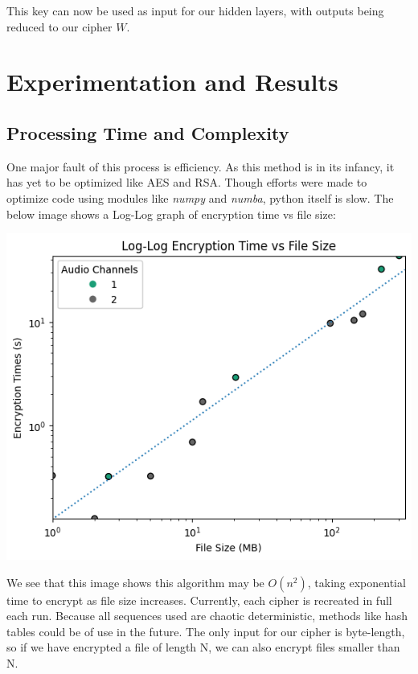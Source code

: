 \documentclass[conference]{IEEEtran}
\begin{document}
This key can now be used as input for our hidden layers, with outputs being reduced to our cipher $W$.

\section{Experimentation and Results}\label{sec:experimentation-and-results}

\subsection{Processing Time and Complexity}\label{subsec:processing-time-and-complexity}

One major fault of this process is efficiency.
As this method is in its infancy, it has yet to be optimized like AES and RSA\@.
Though efforts were made to optimize code using modules like \textit{numpy} and \textit{numba}, python itself is slow.
The below image shows a Log-Log graph of encryption time vs file size:

\begin{center}
    \includegraphics[scale=.5]{images/loglog}
\end{center}

We see that this image shows this algorithm may be $O(n^2)$, taking exponential time to encrypt as file size increases.
Currently, each cipher is recreated in full each run.
Because all sequences used are chaotic deterministic, methods like hash tables could be of use in the future.
The only input for our cipher is byte-length, so if we have encrypted a file of length N, we can also encrypt files smaller than N\@.
\end{document}
